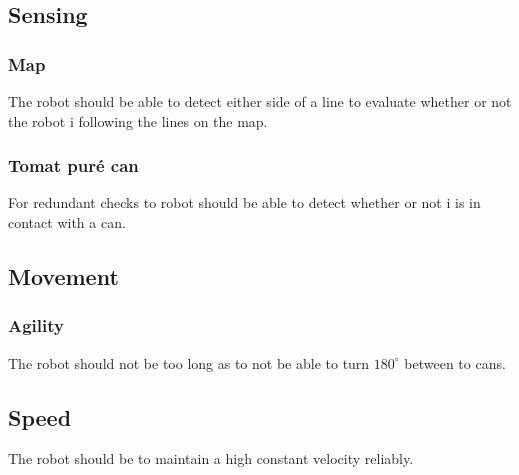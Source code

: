 \documentclass[../../main.tex]{subfiles}
\begin{document}
\subsection{Sensing}%
\label{sub:sensing}

\subsubsection{Map}%
\label{ssub:map}


The robot should be able to detect either side of a line to evaluate whether or not the robot
i following the lines on the map.


\subsubsection{Tomat puré can}%
\label{ssub:tomat_pure_can}

For redundant checks to robot should be able to detect whether or not i is in contact with a can.

\subsection{Movement}%
\label{sub:movement}


\subsubsection{Agility}%
\label{ssub:agility}

The robot should not be too long as to not be able to turn $180^{\circ}$ between to cans.

\subsection{Speed}%
\label{sub:speed}

The robot should be to maintain a high constant velocity reliably.







	
\end{document}

